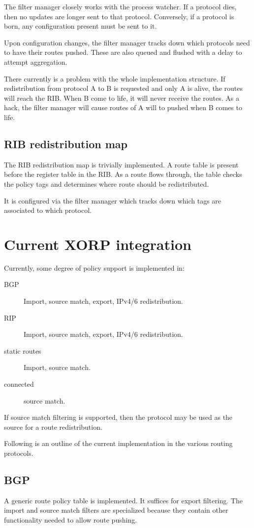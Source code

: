 \documentclass{article}
\begin{document}
The filter manager closely works with the process watcher. If a protocol dies,
then no updates are longer sent to that protocol. Conversely, if a protocol is
born, any configuration present must be sent to it.

Upon configuration changes, the filter manager tracks down which protocols need
to have their routes pushed. These are also queued and flushed with a delay to
attempt aggregation.

There currently is a problem with the whole implementation structure. If
redistribution from protocol A to B is requested and only A is alive, the
routes will reach the RIB. When B come to life, it will never receive the
routes. As a hack, the filter manager will cause routes of A will to pushed when
B comes to life.

\subsection{RIB redistribution map}
The RIB redistribution map is trivially implemented. A route table is present
before the register table in the RIB. As a route flows through, the table checks the
policy tags and determines where route should be redistributed.

It is configured via the filter manager which tracks down which tags are
associated to which protocol.


\section{Current XORP integration}
Currently, some degree of policy support is implemented in:
\begin{description}
\item[BGP] Import, source match, export, IPv4/6 redistribution.
\item[RIP] Import, source match, export, IPv4/6 redistribution.
\item[static routes] Import, source match.
\item[connected] source match.
\end{description}
If source match filtering is supported, then the protocol may be used as the
source for a route redistribution.

Following is an outline of the current implementation in the various routing protocols.

\subsection{BGP}
A generic route policy table is implemented. It suffices for export filtering.
The import and source match filters are specialized because they contain other
functionality needed to allow route pushing.
\end{document}
